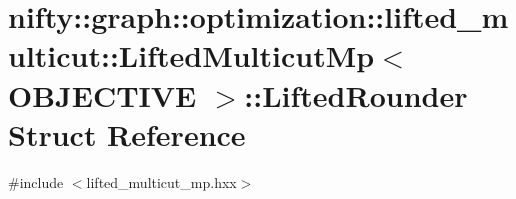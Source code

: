 \hypertarget{structnifty_1_1graph_1_1optimization_1_1lifted__multicut_1_1LiftedMulticutMp_1_1LiftedRounder}{}\section{nifty\+:\+:graph\+:\+:optimization\+:\+:lifted\+\_\+multicut\+:\+:Lifted\+Multicut\+Mp$<$ O\+B\+J\+E\+C\+T\+I\+V\+E $>$\+:\+:Lifted\+Rounder Struct Reference}
\label{structnifty_1_1graph_1_1optimization_1_1lifted__multicut_1_1LiftedMulticutMp_1_1LiftedRounder}


{\ttfamily \#include $<$lifted\+\_\+multicut\+\_\+mp.\+hxx$>$}

